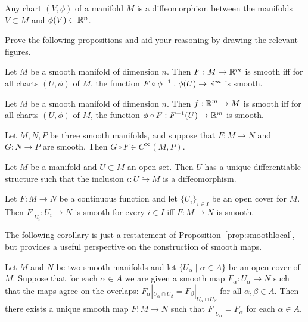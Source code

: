 \begin{ex}
Any chart $(V, \phi)$ of a manifold $M$ is a diffeomorphism between the manifolds $V\subset M$ and $\phi(V)\subset\mathbb{R}^n$.
\end{ex}

\begin{exe}
  Prove the following propositions and aid your reasoning by drawing the relevant figures.
  \begin{prop}
    Let $M$ be a smooth manifold of dimension $n$.
    Then $F:M\to\mathbb{R}^m$ is smooth iff for all charts $(U,\phi)$ of $M$, the function $F\circ\phi^{-1}:\phi(U)\to\mathbb{R}^m$ is smooth.
  \end{prop}
  \begin{prop}
    Let $M$ be a smooth manifold of dimension $n$.
    Then $f:\mathbb{R}^m\to M$ is smooth iff for all charts $(U,\phi)$ of $M$, the function $\phi\circ F:F^{-1}(U)\to\mathbb{R}^m$ is smooth.
  \end{prop}
  \begin{prop}
    Let $M, N, P$ be three smooth manifolds, and suppose that $F:M\to N$ and $G:N\to P$ are smooth.
    Then $G\circ F\in C^\infty(M, P)$.
  \end{prop}
  \begin{prop}\label{prop:uniqdiffeoinclusion}
    Let $M$ be a manifold and $U\subset M$ an open set.
    Then $U$ has a unique differentiable structure such that the inclusion $\iota:U\hookrightarrow M$ is a diffeomorphism.
  \end{prop}
  \begin{prop}\label{prop:smoothlocal}
    Let $F:M\to N$ be a continuous function and let $\{U_i\}_{i\in I}$ be an open cover for $M$. Then $F|_{U_i}:U_i \to N$ is smooth for every $i\in I$ iff $F:M\to N$ is smooth.
  \end{prop}
\end{exe}

The following corollary is just a restatement of Proposition~\ref{prop:smoothlocal}, but provides a useful perspective on the construction of smooth maps.

\begin{prop}
  Let $M$ and $N$ be two smooth manifolds and let $\{U_\alpha\mid\alpha\in A\}$ be an open cover of $M$.
  Suppose that for each $\alpha\in A$ we are given a smooth map $F_
  \alpha:U_\alpha\to N$ such that the maps agree on the overlaps: $F_\alpha|_{U_\alpha\cap U_\beta} = F_\beta|_{U_\alpha\cap U_\beta}$ for all $\alpha,\beta\in A$. 
  Then there exists a unique smooth map $F:M\to N$ such that $F|_{U_\alpha} = F_\alpha$ for each $\alpha\in A$.
\end{prop}

